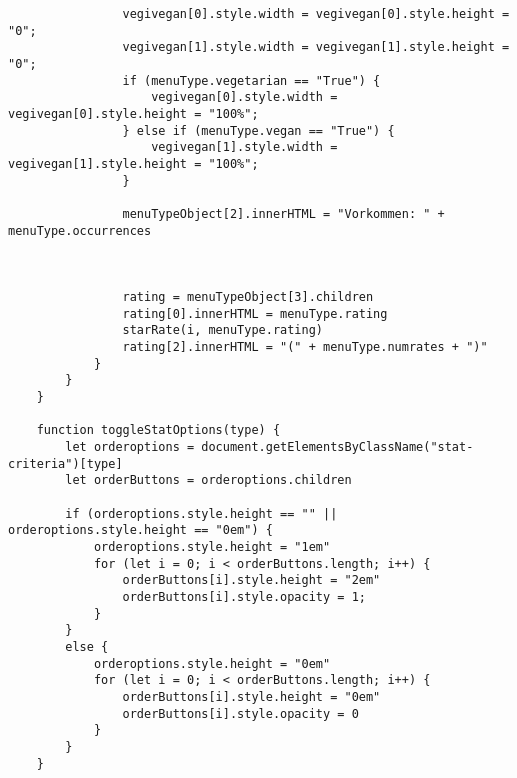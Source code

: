 \begin{lstlisting}
                vegivegan[0].style.width = vegivegan[0].style.height = "0";
                vegivegan[1].style.width = vegivegan[1].style.height = "0";
                if (menuType.vegetarian == "True") {
                    vegivegan[0].style.width = vegivegan[0].style.height = "100%";
                } else if (menuType.vegan == "True") {
                    vegivegan[1].style.width = vegivegan[1].style.height = "100%";
                }
    
                menuTypeObject[2].innerHTML = "Vorkommen: " + menuType.occurrences
    
    
    
                rating = menuTypeObject[3].children
                rating[0].innerHTML = menuType.rating
                starRate(i, menuType.rating)
                rating[2].innerHTML = "(" + menuType.numrates + ")"
            }
        }
    }
    
    function toggleStatOptions(type) {
        let orderoptions = document.getElementsByClassName("stat-criteria")[type]
        let orderButtons = orderoptions.children
    
        if (orderoptions.style.height == "" || orderoptions.style.height == "0em") {
            orderoptions.style.height = "1em"
            for (let i = 0; i < orderButtons.length; i++) {
                orderButtons[i].style.height = "2em"
                orderButtons[i].style.opacity = 1;
            }
        }
        else {
            orderoptions.style.height = "0em"
            for (let i = 0; i < orderButtons.length; i++) {
                orderButtons[i].style.height = "0em"
                orderButtons[i].style.opacity = 0
            }
        }
    }
    
\end{lstlisting}